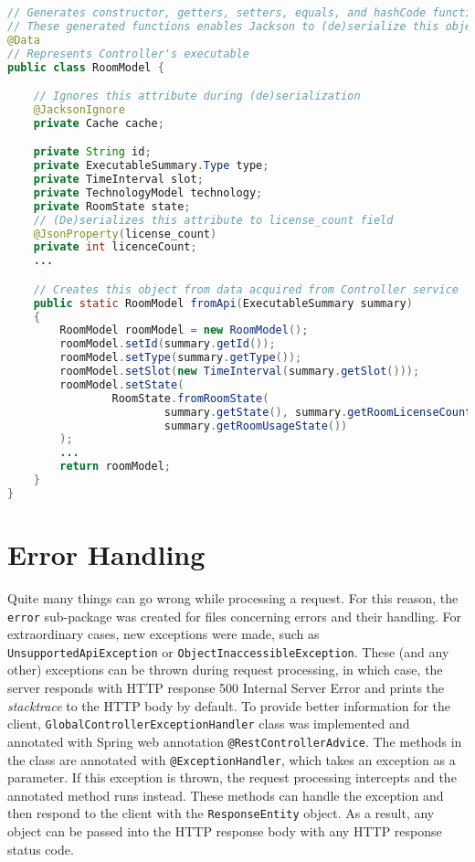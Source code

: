 \begin{lstlisting}[language=java, caption=RoomModel.java, label=lst:model]
// Generates constructor, getters, setters, equals, and hashCode functions
// These generated functions enables Jackson to (de)serialize this object
@Data
// Represents Controller's executable
public class RoomModel {

    // Ignores this attribute during (de)serialization
    @JacksonIgnore
    private Cache cache;

    private String id;
    private ExecutableSummary.Type type;
    private TimeInterval slot;
    private TechnologyModel technology;
    private RoomState state;
    // (De)serializes this attribute to license_count field
    @JsonProperty(license_count)
    private int licenceCount;
    ...

    // Creates this object from data acquired from Controller service
    public static RoomModel fromApi(ExecutableSummary summary)
    {
        RoomModel roomModel = new RoomModel();
        roomModel.setId(summary.getId());
        roomModel.setType(summary.getType());
        roomModel.setSlot(new TimeInterval(summary.getSlot()));
        roomModel.setState(
                RoomState.fromRoomState(
                        summary.getState(), summary.getRoomLicenseCount(),
                        summary.getRoomUsageState())
        );
        ...
        return roomModel;
    }
}
\end{lstlisting}


\section{Error Handling}
Quite many things can go wrong while processing a request. For this reason, the \texttt{error} sub-package was created for files concerning errors and their handling.
For extraordinary cases, new exceptions were made, such as \texttt{UnsupportedApiException} or \texttt{ObjectInaccessibleException}.
These (and any other) exceptions can be thrown during request processing, in which case, the server responds with HTTP response 500 Internal Server Error and prints the \emph{stacktrace} to the HTTP body by default.
To provide better information for the client, \texttt{GlobalController\-ExceptionHandler} class was implemented and annotated with Spring web annotation \texttt{@RestControllerAdvice}.
The methods in the class are annotated with \texttt{@ExceptionHandler}, which takes an exception as a parameter. If this exception is thrown, the request processing intercepts and the annotated method runs instead.
These methods can handle the exception and then respond to the client with the \texttt{ResponseEntity} object. As a result, any object can be passed into the HTTP response body with any HTTP response status code.

